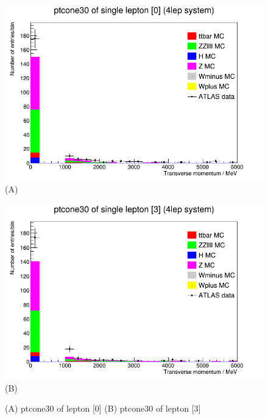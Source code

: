 \begin{figure}[h!]
    \centering
    \begin{minipage}{0.5\textwidth}
        \centering
        \includegraphics[width=\linewidth]{plots/06-03-2021/07-30_06-03-21.png}
        (A)
    \end{minipage}\hfill
    \begin{minipage}{0.5\textwidth}
        \centering
        \includegraphics[width=\linewidth]{plots/06-03-2021/08-29_06-03-21.png}
        (B)
    \end{minipage}
    \caption{(A) ptcone30 of lepton [0] (B) ptcone30 of lepton [3]}
    \label{fig:07-30_06-03-21}
\end{figure}

